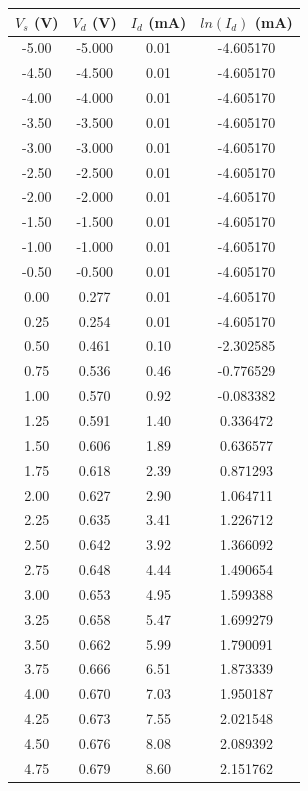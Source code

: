 \documentclass{article}
\begin{document}
\begin{table}[hbtp]
  \centering
  \begin{tabular}{cccc}
    $V_s$ (V) & $V_d$ (V) & $I_d$ (mA) & $ln(I_d)$ (mA) \\
    \hline
    -5.00 & -5.000 & 0.01 & -4.605170 \\
    -4.50 & -4.500 & 0.01 & -4.605170 \\
    -4.00 & -4.000 & 0.01 & -4.605170 \\
    -3.50 & -3.500 & 0.01 & -4.605170 \\
    -3.00 & -3.000 & 0.01 & -4.605170 \\
    -2.50 & -2.500 & 0.01 & -4.605170 \\
    -2.00 & -2.000 & 0.01 & -4.605170 \\
    -1.50 & -1.500 & 0.01 & -4.605170 \\
    -1.00 & -1.000 & 0.01 & -4.605170 \\
    -0.50 & -0.500 & 0.01 & -4.605170 \\
    0.00 & 0.277 & 0.01 & -4.605170 \\
    0.25 & 0.254 & 0.01 & -4.605170 \\
    0.50 & 0.461 & 0.10 & -2.302585 \\
    0.75 & 0.536 & 0.46 & -0.776529 \\
    1.00 & 0.570 & 0.92 & -0.083382 \\
    1.25 & 0.591 & 1.40 & 0.336472 \\
    1.50 & 0.606 & 1.89 & 0.636577 \\
    1.75 & 0.618 & 2.39 & 0.871293 \\
    2.00 & 0.627 & 2.90 & 1.064711 \\
    2.25 & 0.635 & 3.41 & 1.226712 \\
    2.50 & 0.642 & 3.92 & 1.366092 \\
    2.75 & 0.648 & 4.44 & 1.490654 \\
    3.00 & 0.653 & 4.95 & 1.599388 \\
    3.25 & 0.658 & 5.47 & 1.699279 \\
    3.50 & 0.662 & 5.99 & 1.790091 \\
    3.75 & 0.666 & 6.51 & 1.873339 \\
    4.00 & 0.670 & 7.03 & 1.950187 \\
    4.25 & 0.673 & 7.55 & 2.021548 \\
    4.50 & 0.676 & 8.08 & 2.089392 \\
    4.75 & 0.679 & 8.60 & 2.151762 \\

\end{tabular}
\end{table}
\end{document}
